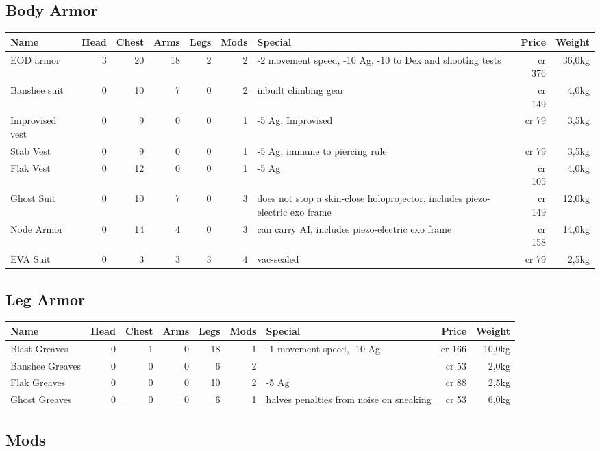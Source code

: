 \documentclass[12pt,a4paper,openany]{book}
\begin{document}
	\subsection{Body Armor}
	\begin{tabularx}{\textwidth}{|l|r|r|r|r|r|l|r|r|}
		\hline
		Name & Head & Chest & Arms & Legs & Mods & Special & Price & Weight \\ \hline
		EOD armor & 3 & 20 & 18 & 2 & 2 & -2 movement speed, -10 Ag, -10 to Dex and shooting tests & cr 376 & 36,0kg \\ \hline
		Banshee suit & 0 & 10 & 7 & 0 & 2 & inbuilt climbing gear & cr 149 & 4,0kg \\ \hline
		Improvised vest & 0 & 9 & 0 & 0 & 1 & -5 Ag, Improvised & cr 79 & 3,5kg \\ \hline
		Stab Vest & 0 & 9 & 0 & 0 & 1 & -5 Ag, immune to piercing rule & cr 79 & 3,5kg \\ \hline
		Flak Vest & 0 & 12 & 0 & 0 & 1 & -5 Ag & cr 105 & 4,0kg \\ \hline
		Ghost Suit & 0 & 10 & 7 & 0 & 3 & does not stop a skin-close holoprojector, includes piezo-electric exo frame & cr 149 & 12,0kg \\ \hline
		Node Armor & 0 & 14 & 4 & 0 & 3 & can carry AI, includes piezo-electric exo frame & cr 158 & 14,0kg \\ \hline
		EVA Suit & 0 & 3 & 3 & 3 & 4 & vac-sealed & cr 79 & 2,5kg \\ \hline
	\end{tabularx}
	\subsection{Leg Armor}
	\begin{tabularx}{\textwidth}{|l|r|r|r|r|r|l|r|r|}
		\hline
		Name & Head & Chest & Arms & Legs & Mods & Special & Price & Weight \\ \hline
		Blast Greaves & 0 & 1 & 0 & 18 & 1 & -1 movement speed, -10 Ag & cr 166 & 10,0kg \\ \hline
		Banshee Greaves & 0 & 0 & 0 & 6 & 2 & & cr 53 & 2,0kg \\ \hline
		Flak Greaves & 0 & 0 & 0 & 10 & 2 & -5 Ag & cr 88 & 2,5kg \\ \hline
		Ghost Greaves & 0 & 0 & 0 & 6 & 1 & halves penalties from noise on sneaking & cr 53 & 6,0kg \\ \hline
	\end{tabularx}
	\subsection{Mods}
\end{document}
